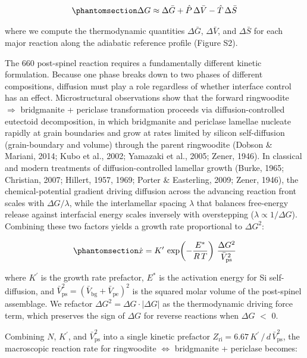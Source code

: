 \documentclass[draft,linenumbers]{agujournal2019}
\begin{document}
\begin{equation}\protect\phantomsection\label{eq:gibbs}{\Delta G \approx \Delta \bar{G} + \hat{P}\, \Delta \bar{V} - \hat{T}\, \Delta \bar{S}}\end{equation}

where we compute the thermodynamic quantities \(\Delta \bar{G}\),
\(\Delta \bar{V}\), and \(\Delta \bar{S}\) for each major reaction along
the adiabatic reference profile (Figure S2).

The 660 post-spinel reaction requires a fundamentally different kinetic
formulation. Because one phase breaks down to two phases of different
compositions, diffusion must play a role regardless of whether interface
control has an effect. Microstructural observations show that the
forward ringwoodite \(\Rightarrow\) bridgmanite + periclase
transformation proceeds via diffusion-controlled eutectoid
decomposition, in which bridgmanite and periclase lamellae nucleate
rapidly at grain boundaries and grow at rates limited by silicon
self-diffusion (grain-boundary and volume) through the parent
ringwoodite (Dobson \& Mariani, 2014; Kubo et al., 2002; Yamazaki et
al., 2005; Zener, 1946). In classical and modern treatments of
diffusion-controlled lamellar growth (Burke, 1965; Christian, 2007;
Hillert, 1957, 1969; Porter \& Easterling, 2009; Zener, 1946), the
chemical-potential gradient driving diffusion across the advancing
reaction front scales with \(\Delta G / \lambda\), while the
interlamellar spacing \(\lambda\) that balances free-energy release
against interfacial energy scales inversely with overstepping
(\(\lambda \propto 1 / \Delta G\)). Combining these two factors yields a
growth rate proportional to \(\Delta G^2\):

\begin{equation}\protect\phantomsection\label{eq:growth-rate-660}{\dot{x} = K^{\prime}\, \exp\!\left(-\frac{E^{\ast}}{R\, T}\right)\, \frac{\Delta G^2}{\bar{V}_\mathrm{ps}^2}}\end{equation}

where \(K^{\prime}\) is the growth rate prefactor, \(E^{\ast}\) is the
activation energy for Si self-diffusion, and
\(\bar{V}_\mathrm{ps}^2 = (\bar{V}_\mathrm{bg} + \bar{V}_\mathrm{pe})^2\)
is the squared molar volume of the post-spinel assemblage. We refactor
\(\Delta G^2 = \Delta G \cdot |\Delta G|\) as the thermodynamic driving
force term, which preserves the sign of \(\Delta G\) for reverse
reactions when \(\Delta G\) \(<\) 0.

Combining \(N\), \(K^{\prime}\), and \(\bar{V}_\mathrm{ps}^2\) into a
single kinetic prefactor
\(Z_\mathrm{ri} = \text{6.67}\, K^{\prime}\, /\, d\, \bar{V}_\mathrm{ps}^2\),
the macroscopic reaction rate for ringwoodite \(\Leftrightarrow\)
bridgmanite + periclase becomes:
\end{document}
